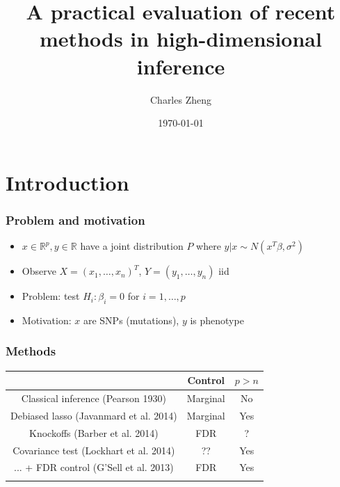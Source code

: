 \documentclass{beamer}
\title{A practical evaluation of recent methods in high-dimensional inference}
\author{Charles Zheng} %
\institute[Stanford] %
{Stanford University}
\date{\today} %
\begin{document}
\begin{frame}
\titlepage %
\end{frame}

\section{Introduction}

\begin{frame}
\frametitle{Problem and motivation}
\begin{itemize}
\item $x \in \mathbb{R}^p, y \in \mathbb{R}$ have a joint distribution $P$ where $y|x \sim N(x^T \beta, \sigma^2)$
\item Observe $X = (x_1, \hdots, x_n)^T$, $Y = (y_1,\hdots, y_n)$ iid
\item Problem: test $H_i: \beta_i = 0$ for $i = 1,\hdots, p$
\item Motivation: $x$ are SNPs (mutations), $y$ is phenotype
\end{itemize}
\end{frame}

\begin{frame}
\frametitle{Methods}
\begin{center}
\begin{tabular}{|c|c|c|} \hline
 & Control & $p > n$\\ \hline
Classical inference (Pearson 1930) & Marginal & No \\ \hline
Debiased lasso (Javanmard et al. 2014) & Marginal & Yes\\ \hline
Knockoffs (Barber et al. 2014) & FDR & ? \\ \hline
Covariance test (Lockhart et al. 2014) &  ?? & Yes \\ 
... + FDR control (G'Sell et al. 2013) &  FDR & Yes \\ \hline
 & &  \\ \hline
\end{tabular}
\end{center}
\end{frame}
\end{document}
